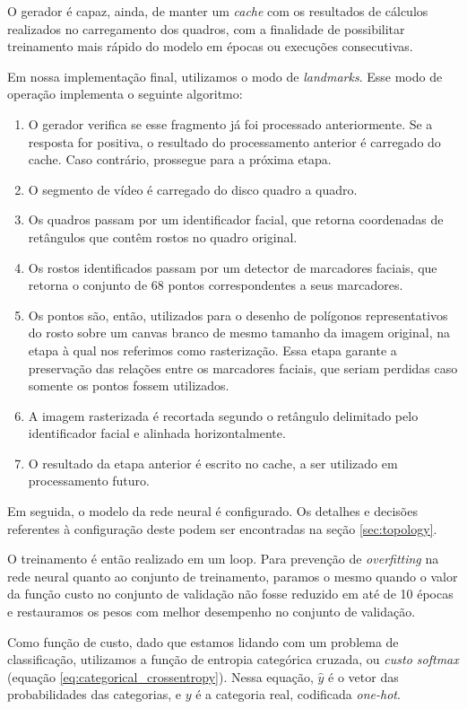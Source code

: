 O gerador é capaz, ainda, de manter um \textit{cache} com os resultados de cálculos realizados no carregamento dos quadros, com a finalidade de possibilitar treinamento mais rápido do modelo em épocas ou execuções consecutivas.

Em nossa implementação final, utilizamos o modo de \textit{landmarks}. Esse modo de operação implementa o seguinte algoritmo:

\begin{enumerate}
    \item O gerador verifica se esse fragmento já foi processado anteriormente. Se a resposta for positiva, o resultado do processamento anterior é carregado do cache. Caso contrário, prossegue para a próxima etapa.
    \item O segmento de vídeo é carregado do disco quadro a quadro. 
    \item Os quadros passam por um identificador facial, que retorna coordenadas de retângulos que contêm rostos no quadro original. 
    \item Os rostos identificados passam por um detector de marcadores faciais, que retorna o conjunto de 68 pontos correspondentes a seus marcadores. 
    \item Os pontos são, então, utilizados para o desenho de polígonos representativos do rosto sobre um canvas branco de mesmo tamanho da imagem original, na etapa à qual nos referimos como rasterização. Essa etapa garante a preservação das relações entre os marcadores faciais, que seriam perdidas caso somente os pontos fossem utilizados. 
    \item A imagem rasterizada é recortada segundo o retângulo delimitado pelo identificador facial e alinhada horizontalmente.
    \item O resultado da etapa anterior é escrito no cache, a ser utilizado em processamento futuro.
\end{enumerate}

Em seguida, o modelo da rede neural é configurado. Os detalhes e decisões referentes à configuração deste podem ser encontradas na seção \ref{sec:topology}. 

O treinamento é então realizado em um loop.
Para prevenção de \textit{overfitting} na rede neural quanto ao conjunto de treinamento, paramos o mesmo quando o valor da função custo no conjunto de validação não fosse reduzido em até de 10 épocas e restauramos os pesos com melhor desempenho no conjunto de validação.

Como função de custo, dado que estamos lidando com um problema de classificação, utilizamos a função de entropia categórica cruzada, ou \textit{custo softmax} (equação \ref{eq:categorical_crossentropy}).
Nessa equação, $\hat{y}$ é o vetor das probabilidades das categorias, e $y$ é a categoria real, codificada \textit{one-hot}.


